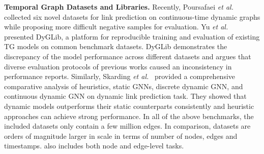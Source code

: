 




\textbf{Temporal Graph Datasets and Libraries.}
Recently, Poursafaei \emph{et al.}~\cite{poursafaeitowards} collected six novel datasets for link prediction on continuous-time dynamic graphs while proposing more difficult negative samples for evaluation.  Yu \emph{et al.}~\cite{yu2023towards} presented DyGLib, a platform for reproducible training and evaluation of existing TG models on common benchmark datasets. DyGLib demonstrates the discrepancy of the model performance across different datasets and argues that diverse evaluation protocols of previous works caused an inconsistency in performance reports. Similarly, Skarding \emph{et al.}~\cite{skarding2022robust} provided a comprehensive comparative analysis of heuristics, static GNNs, discrete dynamic GNN, and continuous dynamic GNN on dynamic link prediction task. They showed that dynamic models outperforms their static counterparts consistently and heuristic approaches can achieve strong performance. In all of the above benchmarks, the included datasets only contain a few million edges. In comparison, \name datasets are orders of magnitude larger in scale in terms of number of nodes, edges and timestamps. \name also includes both node and edge-level tasks. 



